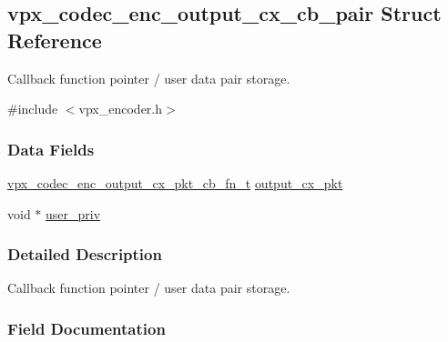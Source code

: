 \hypertarget{structvpx__codec__enc__output__cx__cb__pair}{}\subsection{vpx\+\_\+codec\+\_\+enc\+\_\+output\+\_\+cx\+\_\+cb\+\_\+pair Struct Reference}
\label{structvpx__codec__enc__output__cx__cb__pair}


Callback function pointer / user data pair storage.  




{\ttfamily \#include $<$vpx\+\_\+encoder.\+h$>$}

\subsubsection*{Data Fields}
\begin{DoxyCompactItemize}
\item 
\hyperlink{group__encoder_ga2ced5dac1f5d963a38bd4d2a05ec8bd9}{vpx\+\_\+codec\+\_\+enc\+\_\+output\+\_\+cx\+\_\+pkt\+\_\+cb\+\_\+fn\+\_\+t} \hyperlink{structvpx__codec__enc__output__cx__cb__pair_acd1d60f7b6f9f483c2092c69afe824a5}{output\+\_\+cx\+\_\+pkt}
\item 
void $\ast$ \hyperlink{structvpx__codec__enc__output__cx__cb__pair_abdb90f4a657b70be286327b091c8f70c}{user\+\_\+priv}
\end{DoxyCompactItemize}


\subsubsection{Detailed Description}
Callback function pointer / user data pair storage. 

\subsubsection{Field Documentation}
